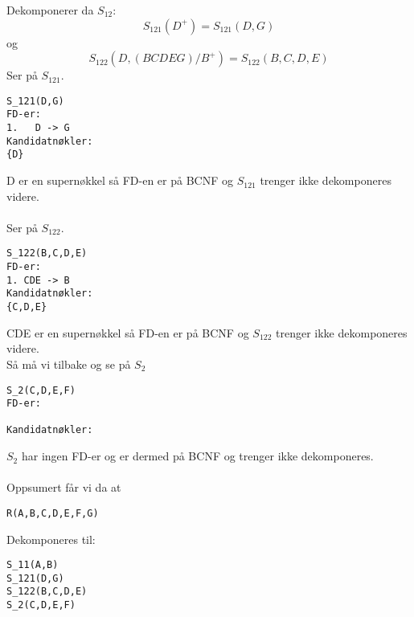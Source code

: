 \documentclass[12pt, letterpaper, twoside]{article}
\begin{document}
Dekomponerer da $S_{12}$:
$$
S_{121}(D^+) = S_{121}(D,G)
$$
og
$$
S_{122}(D,(BCDEG)/B^+) = S_{122}(B,C,D,E)
$$
Ser på $S_{121}$.
\begin{verbatim}
S_121(D,G)
FD-er:
1.   D -> G
Kandidatnøkler:
{D}
\end{verbatim}
D er en supernøkkel så FD-en er på BCNF og $S_{121}$ trenger ikke dekomponeres videre.\\
\ \\
Ser på $S_{122}$.
\begin{verbatim}
S_122(B,C,D,E)
FD-er:
1. CDE -> B
Kandidatnøkler:
{C,D,E}
\end{verbatim}
CDE er en supernøkkel så FD-en er på BCNF og $S_{122}$ trenger ikke dekomponeres videre.
\newpage
\ \\
Så må vi tilbake og se på $S_2$
\begin{verbatim}
S_2(C,D,E,F)
FD-er:

Kandidatnøkler:

\end{verbatim}
$S_2$ har ingen FD-er og er dermed på BCNF og trenger ikke dekomponeres.\\
\ \\
Oppsumert får vi da at
\begin{verbatim}
R(A,B,C,D,E,F,G)
\end{verbatim}
Dekomponeres til:
\begin{verbatim}
S_11(A,B)
S_121(D,G)
S_122(B,C,D,E)
S_2(C,D,E,F)
\end{verbatim}
\end{document}
